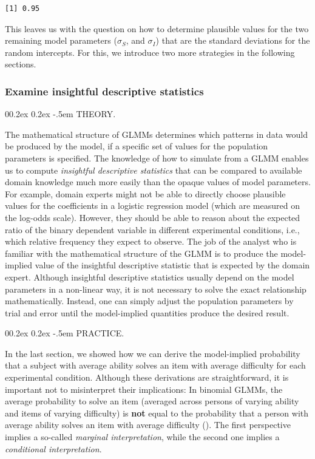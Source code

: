 \documentclass[
  man,
  floatsintext,
  longtable,
  a4paper,
  nolmodern,
  notxfonts,
  notimes,
  colorlinks=true,linkcolor=blue,citecolor=blue,urlcolor=blue]{apa7}
\makeatletter
\renewcommand{\paragraph}{\@startsection{paragraph}{4}{\parindent}%
	{0\baselineskip \@plus 0.2ex \@minus 0.2ex}%
	{-.5em}%
	{\normalfont\normalsize\bfseries\typesectitle}}
\makeatother
\begin{document}
\begin{verbatim}
[1] 0.95
\end{verbatim}

This leaves us with the question on how to determine plausible values
for the two remaining model parameters (\(\sigma_S\), and \(\sigma_I\))
that are the standard deviations for the random intercepts. For this, we
introduce two more strategies in the following sections.

\subsubsection{Examine insightful descriptive
statistics}\label{examine-insightful-descriptive-statistics}

\paragraph{THEORY.}\label{theory-3}

The mathematical structure of GLMMs determines which patterns in data
would be produced by the model, if a specific set of values for the
population parameters is specified. The knowledge of how to simulate
from a GLMM enables us to compute \emph{insightful descriptive
statistics} that can be compared to available domain knowledge much more
easily than the opaque values of model parameters. For example, domain
experts might not be able to directly choose plausible values for the
coefficients in a logistic regression model (which are measured on the
log-odds scale). However, they should be able to reason about the
expected ratio of the binary dependent variable in different
experimental conditions, i.e., which relative frequency they expect to
observe. The job of the analyst who is familiar with the mathematical
structure of the GLMM is to produce the model-implied value of the
insightful descriptive statistic that is expected by the domain expert.
Although insightful descriptive statistics usually depend on the model
parameters in a non-linear way, it is not necessary to solve the exact
relationship mathematically. Instead, one can simply adjust the
population parameters by trial and error until the model-implied
quantities produce the desired result.

\paragraph{PRACTICE.}\label{practice-3}

In the last section, we showed how we can derive the model-implied
probability that a subject with average ability solves an item with
average difficulty for each experimental condition. Although these
derivations are straightforward, it is important not to misinterpret
their implications: In binomial GLMMs, the average probability to solve
an item (averaged across persons of varying ability and items of varying
difficulty) is \textbf{not} equal to the probability that a person with
average ability solves an item with average difficulty
(). The first perspective implies a so-called \emph{marginal
interpretation}, while the second one implies a \emph{conditional
interpretation}.
\end{document}
